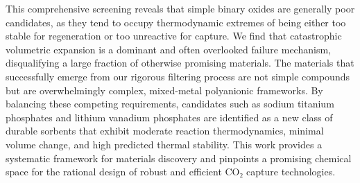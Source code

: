 \documentclass[]{article}
\begin{document}
This comprehensive screening reveals that simple binary oxides are generally poor candidates, as they tend to occupy thermodynamic extremes of being either too stable for regeneration or too unreactive for capture. We find that catastrophic volumetric expansion is a dominant and often overlooked failure mechanism, disqualifying a large fraction of otherwise promising materials. The materials that successfully emerge from our rigorous filtering process are not simple compounds but are overwhelmingly complex, mixed-metal polyanionic frameworks. By balancing these competing requirements, candidates such as sodium titanium phosphates and lithium vanadium phosphates are identified as a new class of durable sorbents that exhibit moderate reaction thermodynamics, minimal volume change, and high predicted thermal stability. This work provides a systematic framework for materials discovery and pinpoints a promising chemical space for the rational design of robust and efficient CO₂ capture technologies.
\end{document}
